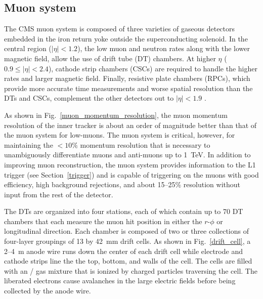 

\subsection{Muon system}
The CMS muon system is composed of three varieties of gaseous detectors embedded in the iron return yoke outside the superconducting solenoid. In the central region ($|\eta|<1.2$), the low muon and neutron rates along with the lower magnetic field, allow the use of drift tube (DT) chambers. At higher $\eta$ ($0.9\leq|\eta|<2.4$), cathode strip chambers (CSCs) are required to handle the higher rates and larger magnetic field. Finally, resistive plate chambers (RPCs), which provide more accurate time measurements and worse spatial resolution than the DTs and CSCs, complement the other detectors out to $|\eta|<1.9$ \cite{cms_tdr_v1, cms_ms_performance}.

As shown in Fig.~\ref{muon_momentum_resolution}, the muon momentum resolution of the inner tracker is about an order of magnitude better than that of the muon system for low-\pt muons. The muon system is critical, however, for maintaining the $<10\%$ momentum resolution that is necessary to unambiguously differentiate muons and anti-muons up to \SI{1}{\TeV}. In addition to improving muon reconstruction, the muon system provides information to the L1 trigger (see Section~\ref{trigger}) and is capable of triggering on the muons with good efficiency, high background rejections, and about 15--25\% \pt resolution without input from the rest of the detector.



The DTs are organized into four stations, each of which contain up to 70 DT chambers that each measure the muon hit position in either the $r$-$\phi$ or longitudinal direction. Each chamber is composed of two or three collections of four-layer groupings of \num{13} by \SI{42}{\mm} drift cells. As shown in Fig.~\ref{drift_cell}, a \si{2}--\SI{4}{\m} anode wire runs down the center of each drift cell while electrode and cathode strips line the the top, bottom, and walls of the cell. The cells are filled with an / gas mixture that is ionized by charged particles traversing the cell. The liberated electrons cause avalanches in the large electric fields before being collected  by the anode wire.




